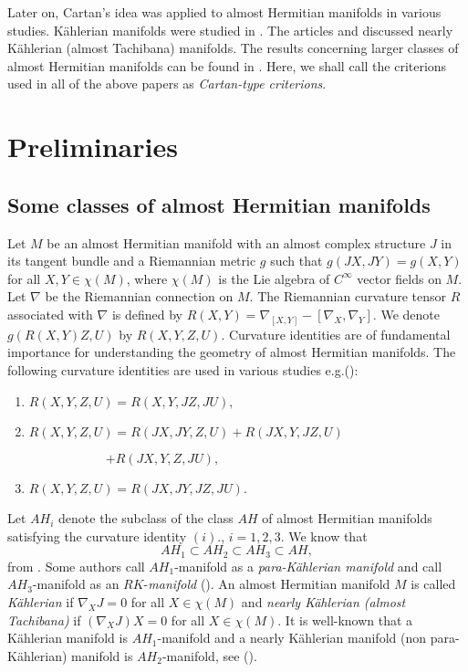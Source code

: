 \documentclass{amsart}
\newtheorem*{theorem A}{Theorem A}
\newtheorem*{theorem B}{N\"olker's Theorem}
\theoremstyle{remark}
\theoremstyle{remark}
\theoremstyle{definition}
\numberwithin{equation}{section}
\begin{document}
Later on, Cartan's idea was applied to almost Hermitian manifolds in
various studies. K\"{a}hlerian manifolds were studied in
\cite{BChe,Gol,Ha,Kassa,No,Yama,Yano}. The articles \cite{Vanh} and
\cite{Yam} discussed nearly K\"{a}hlerian (almost Tachibana)
manifolds. The results concerning larger classes of almost Hermitian
manifolds can be found in \cite{Kas,Kass,Tas,Van,Vanh}. Here, we
shall call the criterions used in all of the above papers as
\emph{Cartan-type criterions}.
\section{Preliminaries}

\subsection{Some classes of almost Hermitian manifolds}
Let $M$ be an almost Hermitian manifold with an almost complex
structure $J$ in its tangent bundle and a Riemannian metric $g$ such
that $g(JX,JY)=g(X,Y)$ for all $X,Y\in\chi(M)$, where $\chi(M)$ is
the Lie algebra of $C^{\infty}$ vector fields on $M$. Let $\nabla$
be the Riemannian connection on $M$. The Riemannian  curvature
tensor $R$ associated with $\nabla$ is defined by
$R(X,Y)=\nabla_{[X,Y]}-[\nabla_{X},\nabla_{Y}].$ We denote
$g(R(X,Y)Z,U)$ by $R(X,Y,Z,U)$. Curvature identities are of
fundamental importance for understanding the geometry of almost
Hermitian manifolds. The following curvature identities are used in
various studies e.g.(\cite{Graya,Graylv}):
\begin{enumerate}
\item $R(X,Y,Z,U)=R(X,Y,JZ,JU),$

\item  $R(X,Y,Z,U)=R(JX,JY,Z,U)+R(JX,Y,JZ,U)$

               $\quad\quad\quad\quad\quad\quad$$+R(JX,Y,Z,JU),$

\item $R(X,Y,Z,U)=R(JX,JY,JZ,JU)$.
\end{enumerate}
Let $AH_{i}$ denote the subclass of the class $AH$ of almost
Hermitian manifolds satisfying the curvature identity $(i).$,
$i=1,2,3.$ We know that
$$AH_{1}\subset AH_{2}\subset AH_{3}\subset AH,$$
from  \cite{Graya}. Some authors call $AH_{1}$-manifold as a
\emph{para-K\"{a}hlerian manifold} and call $AH_{3}$-manifold as an
$RK$-\emph{manifold} (\cite{Van}). An almost Hermitian manifold $M$
is called \emph{K\"{a}hlerian} if $\nabla_{X}J=0$ for all
$X\in\chi(M)$ and \emph{nearly K\"{a}hlerian (almost Tachibana)} if
$(\nabla_{X}J)X=0$ for all $X\in\chi(M).$ It is well-known that a
K\"{a}hlerian manifold is $AH_{1}$-manifold and  a nearly
K\"{a}hlerian manifold (non para-K\"{a}hlerian) manifold
is $AH_{2}$-manifold, see (\cite{Graylv,Van}).\\
\end{document}
